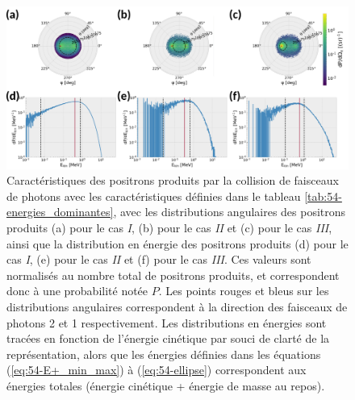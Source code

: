 \begin{refsection}
\begin{figure}[hbtp]
	\centering
	\includegraphics[width=\linewidth]{5-opti_theorique/cinematique_angles_energies.png}
	\caption{Caractéristiques des positrons produits par la collision de faisceaux de photons avec les caractéristiques définies dans le tableau \ref{tab:54-energies_dominantes}, avec les distributions angulaires des positrons produits (a) pour le cas \textit{I}, (b) pour le cas \textit{II} et (c) pour le cas \textit{III}, ainsi que la distribution en énergie des positrons produits (d) pour le cas \textit{I}, (e) pour le cas \textit{II} et (f) pour le cas \textit{III}. Ces valeurs sont normalisés au nombre total de positrons produits, et correspondent donc à une probabilité notée $P$. Les points rouges et bleus sur les distributions angulaires correspondent à la direction des faisceaux de photons 2 et 1 respectivement. Les distributions en énergies sont tracées en fonction de l'énergie cinétique par souci de clarté de la représentation, alors que les énergies définies dans les équations (\ref{eq:54-E+_min_max}) à (\ref{eq:54-ellipse}) correspondent aux énergies totales (énergie cinétique + énergie de masse au repos).}
	\label{fig:54-resultats_cinematique}
\end{figure}


\end{refsection}
